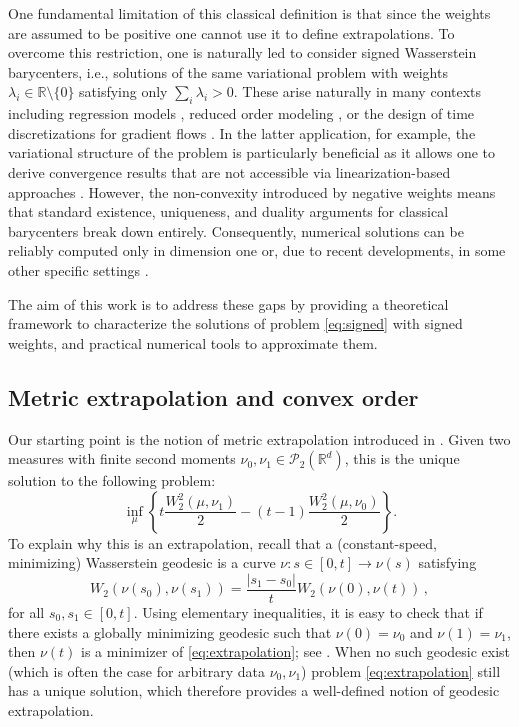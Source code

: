 \documentclass[12pt]{amsart}
\numberwithin{equation}{section}
\let\mc=\mathcal
\theoremstyle{plain}
\theoremstyle{definition}
\begin{document}
One fundamental limitation of this classical definition is that since the weights are assumed to be positive one cannot use it to define extrapolations. To overcome this restriction, one is naturally led to consider
signed Wasserstein barycenters, i.e., solutions of the same variational problem with weights $\lambda_i\in \mathbb{R}\setminus\{0\}$ 
satisfying only $\sum_i \lambda_i >0$. These arise naturally in many contexts including regression models \cite{petersen2019frechet,dubey2020functional,schotz2021frechet}, reduced order modeling \cite{dalery2023nonlinear}, or the design of time discretizations for gradient flows \cite{Matthes2019bdf2,gallouet2024geodesic,han2023high}. In the latter application, for example, the variational structure of the problem is particularly beneficial as it allows one to derive convergence results that are not accessible via linearization-based approaches \cite{gallouet2024geodesic}.
However, the non-convexity introduced by negative weights means that standard existence, uniqueness, and duality arguments for classical barycenters break down entirely. Consequently, numerical solutions can be reliably computed only in dimension one or, due to recent developments, in some other specific settings \cite{nguyen2026fr,gallouet2025metric}.




The aim of this work is to address these gaps by providing a theoretical framework to characterize the solutions of problem \eqref{eq:signed} with signed weights, and practical numerical tools to approximate them.  

\subsection{Metric extrapolation and convex order} Our starting point is the notion of metric extrapolation introduced in \cite{gallouet2025metric}. Given two measures with finite second moments $\nu_0,\nu_1 \in \mc{P}_2(\mathbb{R}^d)$, this is the unique solution to the following problem:
\begin{equation}\label{eq:extrapolation}
\inf_\mu \left \{ t \frac{W^2_2(\mu,\nu_1)}{2} - (t-1)\frac{W^2_2(\mu,\nu_0)}{2}  \right\}.
\end{equation}
To explain why this is an extrapolation, recall that a (constant-speed, minimizing) Wasserstein geodesic is a curve $\nu :s\in[0,t] \rightarrow \nu(s)$ satisfying
\begin{equation}\label{eq:geodesicd}
W_2(\nu(s_0),\nu(s_1)) = \frac{|s_1-s_0|}{t} W_2(\nu(0),\nu(t))\,, 
 \end{equation}   
 for all $s_0,s_1\in [0,t]$. 
 Using elementary inequalities, it is easy to check that if there exists a globally minimizing geodesic such that $\nu(0)=\nu_0$ and $\nu(1)=\nu_1$, then $\nu(t)$  is  a minimizer of \eqref{eq:extrapolation}; see \cite{gallouet2025metric}. When no such geodesic exist (which is often the case for arbitrary data $\nu_0,\nu_1$) problem \eqref{eq:extrapolation} still has a unique solution, which therefore provides a well-defined notion of geodesic extrapolation.
\end{document}
